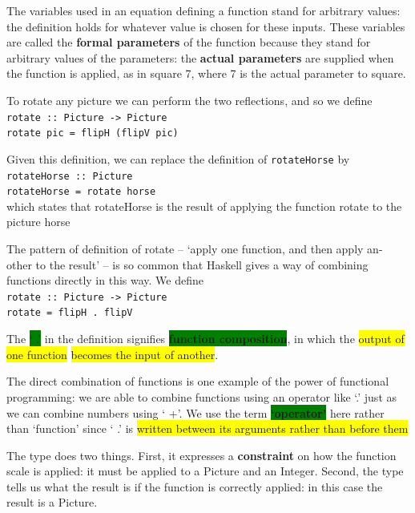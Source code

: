 \documentclass[tikz,border=10pt]{project_plan}
\begin{document}
The variables used in an equation defining a function stand for arbitrary values: the
definition holds for whatever value is chosen for these inputs. These variables are
called the \textbf{formal parameters} of the function because they stand for arbitrary values
of the parameters: the \textbf{actual parameters} are supplied when the function is applied,
as in square 7, where 7 is the actual parameter to square.

To rotate any picture we can perform the two reflections, and so we define\\
\lstinline[columns=fixed]|rotate :: Picture -> Picture|\\
\lstinline[columns=fixed]|rotate pic = flipH (flipV pic)|

Given this definition, we can replace the definition of \lstinline[columns=fixed]|rotateHorse| by\\
\lstinline[columns=fixed]|rotateHorse :: Picture|\\
\lstinline[columns=fixed]|rotateHorse = rotate horse|\\
which states that rotateHorse is the result of applying the function rotate to the
picture horse

The pattern of definition of rotate – ‘apply one function, and then apply an-
other to the result’ – is so common that Haskell gives a way of combining functions
directly in this way. We define\\
\lstinline[columns=fixed]|rotate :: Picture -> Picture|\\
\lstinline[columns=fixed]|rotate = flipH . flipV|

The \colorbox{green}{‘ .’} in the definition signifies \colorbox{green}{\textbf{function composition}}, in which the \colorbox{yellow}{output of one
  function} \colorbox{yellow}{becomes the input of another}.

The direct combination of functions is one example of the power of functional
programming: we are able to combine functions using an operator like ‘.’ just as
we can combine numbers using ‘ +’. We use the term \colorbox{green}{\textbf{‘operator’}} here rather than
‘function’ since ‘ .’ is \colorbox{yellow}{written between its arguments rather than before them}

The type does two things. First, it expresses a \textbf{constraint} on how the function
scale is applied: it must be applied to a Picture and an Integer. Second, the type
tells us what the result is if the function is correctly applied: in this case the result is
a Picture.
\end{document}
